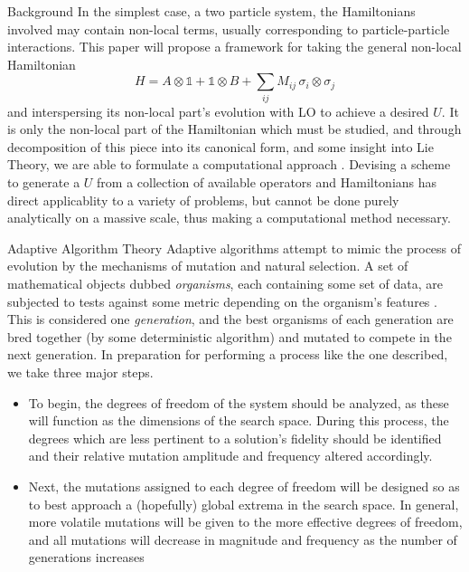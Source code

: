 \documentclass[12pt]{beamer}
\begin{document}
\begin{frame}
\begin{columns}
\begin{column}{.45\textwidth}
\begin{block}{Background}
	In the simplest case, a two particle system, the Hamiltonians involved may contain non-local terms, usually corresponding to particle-particle interactions. This paper will propose a framework for taking the general non-local Hamiltonian \cite{bennett} 
	\begin{equation}
	H = A \otimes \mathds{1} + \mathds{1} \otimes B + \sum_{ij} M_{ij}\,  \sigma_i \otimes \sigma_j
	\end{equation}
	and interspersing its non-local part's evolution with LO to achieve a desired $U$. It is only the non-local part of the Hamiltonian which must be studied, and through decomposition of this piece into its canonical form, and some insight into Lie Theory, we are able to formulate a computational approach \cite{haselgrove}. Devising a scheme to generate a $U$ from a collection of available operators and Hamiltonians has direct applicablity to a variety of problems, but cannot be done purely analytically on a massive scale, thus making a computational method necessary.
				\end{block}
				\vspace{1em}
				\begin{exampleblock}{Adaptive Algorithm Theory}
	Adaptive algorithms attempt to mimic the process of evolution by the mechanisms of mutation and natural selection. A set of mathematical objects dubbed \emph{organisms}, each containing some set of data, are subjected to tests against some metric depending on the organism's features \cite{weise}. This is considered one \emph{generation}, and the best organisms of each generation are bred together (by some deterministic algorithm) and mutated to compete in the next generation. In preparation for performing a process like the one described, we take three major steps.
	\begin{itemize}
	\item To begin, the degrees of freedom of the system should be analyzed, as these will function as the dimensions of the search space. During this process, the degrees which are less pertinent to a solution's fidelity should be identified and their relative mutation amplitude and frequency altered accordingly.

	\item Next, the mutations assigned to each degree of freedom will be designed so as to best approach a (hopefully) global extrema in the search space. In general, more volatile mutations will be given to the more effective degrees of freedom, and all mutations will decrease in magnitude and frequency as the number of generations increases \cite{satsangi}


\end{itemize}
\end{exampleblock}
\end{column}
\end{columns}
\end{frame}
\end{document}
